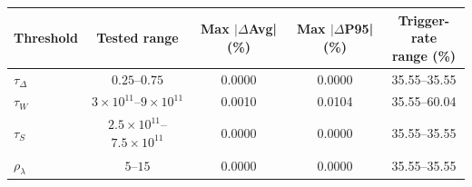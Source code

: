 \begin{center}
\label{tab:threshold_sensitivity}
\setlength{\tabcolsep}{5pt}
\renewcommand{\arraystretch}{1.08}
\begin{tabular}{lcccc}
\toprule
\textbf{Threshold} & \textbf{Tested range} & \makecell{\textbf{Max }$|\Delta$\textbf{Avg}|\\\textbf{(\%)}} & \makecell{\textbf{Max }$|\Delta$\textbf{P95}|\\\textbf{(\%)}} & \makecell{\textbf{Trigger-rate}\\\textbf{range (\%)}} \\
\midrule
$\tau_\Delta$ & $0.25$--$0.75$ & 0.0000 & 0.0000 & 35.55--35.55 \\
$\tau_W$ & $3\times10^{11}$--$9\times10^{11}$ & 0.0010 & 0.0104 & 35.55--60.04 \\
$\tau_S$ & $2.5\times10^{11}$--$7.5\times10^{11}$ & 0.0000 & 0.0000 & 35.55--35.55 \\
$\rho_\lambda$ & $5$--$15$ & 0.0000 & 0.0000 & 35.55--35.55 \\
\bottomrule
\end{tabular}
\end{center}
